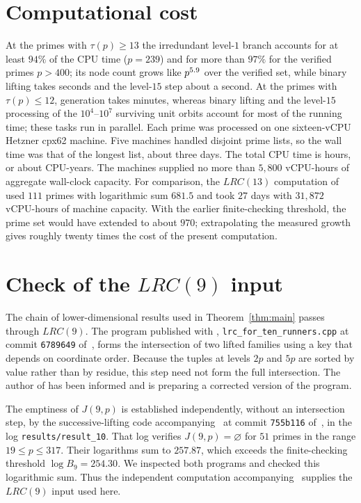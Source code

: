 \documentclass[11pt]{article}
\theoremstyle{definition}
\theoremstyle{remark}
\begin{document}
\section{Computational cost}\label{sec:cost}



At the primes with $\tau(p)\geq13$ the irredundant level-$1$ branch
accounts for at least $94\%$ of the CPU time ($p=239$) and for more than
$97\%$ for the verified primes $p>400$; its node count grows like $p^{5.9}$
over the verified set, while binary lifting takes seconds and the
level-$15$ step about a second.  At the primes with $\tau(p)\leq12$,
generation takes minutes, whereas binary lifting and the level-$15$
processing of the $10^4$--$10^7$ surviving unit orbits account for most
of the running time; these tasks run in
parallel.  Each prime was processed on one sixteen-vCPU Hetzner cpx62
machine.  Five machines handled disjoint prime lists, so the wall time was
that of the longest list, about three days.  The total CPU time is
\TotalCpuHours{} hours, or about \TotalCpuYears{} CPU-years.  The machines
supplied no more than $5{,}800$ vCPU-hours of aggregate wall-clock
capacity.  For comparison, the
$LRC(13)$ computation of~\cite{Allikvere26} used $111$ primes with
logarithmic sum $681.5$ and took $27$ days with $31{,}872$ vCPU-hours of
machine capacity.  With the earlier finite-checking threshold, the prime
set would have extended to about $970$; extrapolating the measured growth
gives roughly twenty times the cost of the present computation.

\section{Check of the \texorpdfstring{$LRC(9)$}{LRC(9)} input}\label{app:source}

The chain of lower-dimensional results used in Theorem~\ref{thm:main}
passes through $LRC(9)$.  The program published with
\cite{Trakulthongchai26}, \texttt{lrc\_for\_ten\_runners.cpp} at commit
\texttt{6789649} of~\cite{TrakulthongchaiCode}, forms the intersection of
two lifted families using a key that depends on coordinate order.  Because
the tuples at levels $2p$ and $5p$ are sorted by value rather than by
residue, this step need not form the full intersection.  The author of
\cite{Trakulthongchai26} has been informed and is preparing a corrected
version of the program.

The emptiness of $J(9,p)$ is established independently, without an
intersection step, by the successive-lifting code accompanying~\cite{ST26}
at commit \texttt{755b116} of~\cite{STcode}, in the log
\texttt{results/result\_10}.  That log verifies $J(9,p)=\varnothing$ for
$51$ primes in the range $19\leq p\leq317$.  Their logarithms sum to
$257.87$, which exceeds the finite-checking threshold
$\log B_9=254.30$.  We inspected both programs and checked this
logarithmic sum.  Thus the independent computation accompanying~\cite{ST26}
supplies the $LRC(9)$ input used here.
\end{document}

